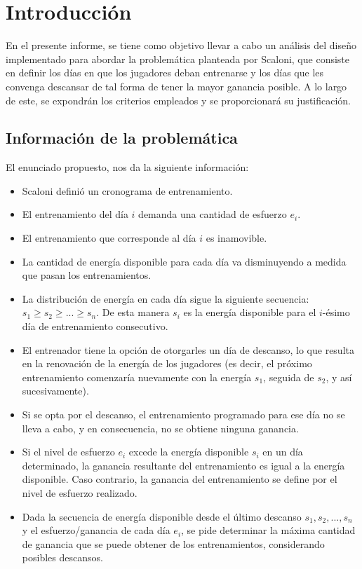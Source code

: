 \section{Introducción}

En el presente informe, se tiene como objetivo llevar a cabo un análisis del diseño 
implementado para abordar la problemática planteada por Scaloni, que consiste en 
definir los días en que los jugadores deban entrenarse y los días que les convenga descansar
de tal forma de tener la mayor ganancia posible. A lo largo de este, se expondrán los criterios
empleados y se proporcionará su justificación.


\subsection{Información de la problemática}

El enunciado propuesto, nos da la siguiente información:

\begin{itemize}
    \item Scaloni definió un cronograma de entrenamiento.
    \item El entrenamiento del día $i$ demanda una cantidad de esfuerzo $e_i$.
    \item El entrenamiento que corresponde al día $i$ es inamovible.
    \item  La cantidad de energía disponible para cada día va disminuyendo a medida que pasan
    los entrenamientos.
    \item La distribución de energía en cada día sigue la siguiente secuencia:  $s_1 \geq s_2 \geq ... \geq s_n$. De esta manera
    $s_i$ es la energía disponible para el $i$-ésimo día de entrenamiento consecutivo.
    \item El entrenador tiene la opción de otorgarles un día de descanso, lo que resulta en la renovación de la 
    energía de los jugadores (es decir, el próximo entrenamiento comenzaría nuevamente con la energía $s_1$, seguida
    de $s_2$, y así sucesivamente). 
    \item Si se opta por el descanso, el entrenamiento programado para ese día no se lleva a cabo, y en consecuencia, 
    no se obtiene ninguna ganancia.
    \item Si el nivel de esfuerzo $e_i$ excede la energía disponible $s_i$ en un día determinado,
     la ganancia resultante del entrenamiento es igual a la energía disponible. Caso contrario, la ganancia del entrenamiento se 
     define por el nivel de esfuerzo realizado.
    \item Dada la secuencia de energía disponible desde el último descanso $s_1 , s_2 ,..., s_n$ y el esfuerzo/ganancia de cada día 
     $e_i$, se pide determinar la máxima cantidad de ganancia que se puede obtener de los entrenamientos, considerando posibles descansos.
\end{itemize}
